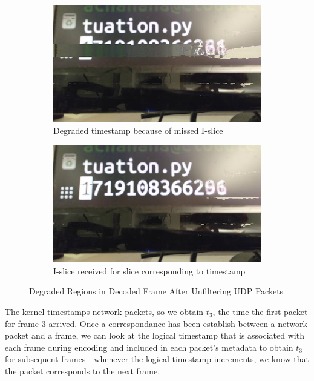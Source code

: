 \begin{figure}[htbp]
    \centering
    \begin{subfigure}[t]{0.45\textwidth}
        \centering
        \includegraphics[width = \textwidth]{figs/garbled-ts-1.jpg}
        \caption{Degraded timestamp because of missed I-slice}
        \label{fig:garbled-ts-1}
    \end{subfigure}
    \hfill
    \begin{subfigure}[t]{0.45\textwidth}
        \centering
        \includegraphics[width = \textwidth]{figs/garbel-ts-2.jpg}
        \caption{I-slice received for slice corresponding to timestamp}
        \label{fig:garbled-ts-2}
    \end{subfigure}
    \caption{Degraded Regions in Decoded Frame After Unfiltering UDP Packets}
\end{figure}

The kernel timestamps network packets, so we obtain $t_3$, the time the first
packet for frame \cref{fig:garbled-ts-2} arrived. Once a correspondance has
been establish between a network packet and a frame, we can look at the logical
timestamp that is associated with each frame during encoding and included in
each packet's metadata to obtain $t_3$ for subsequent frames---whenever the
logical timestamp increments, we know that the packet corresponds to the next
frame.

